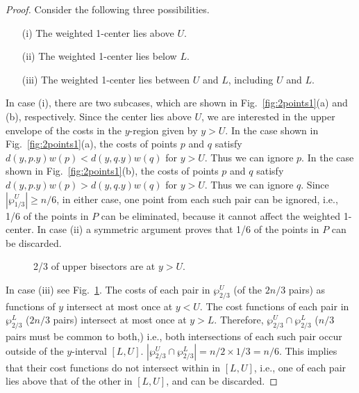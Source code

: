 \documentclass[preprint,10pt]{elsarticle}
\begin{document}
\begin{proof}
Consider the following three possibilities.
\begin{enumerate}
\item[(i)]
The weighted 1-center lies above $U$.
\item[(ii)]
The weighted 1-center lies below $L$.
\item[(iii)]
The weighted 1-center lies between $U$ and $L$,
including $U$ and $L$.
\end{enumerate}

In case (i), there are two subcases,
which are shown in Fig.~\ref{fig:2points1}(a) and (b), respectively.
Since the center lies above $U$, 
we are interested in the upper envelope of the costs in the 
$y$-region given by $y > U$.
In the case shown in Fig.~\ref{fig:2points1}(a),
the costs of points $p$ and $q$ satisfy $d(y,p.y)w(p) <  d(y,q.y)w(q)$ for $y > U$.
Thus we can ignore $p$.
In the case shown in Fig.~\ref{fig:2points1}(b),
 the costs of points $p$ and $q$ satisfy
$d(y,p.y)w(p) >  d(y,q.y)w(q)$ for $y > U$.
Thus we can ignore $q$.
Since $|\wp^U_{1/3}|\geq n/6$,
in either case, one point from each such pair can be ignored,
i.e., 1/6 of the points in $P$ can be eliminated, because it cannot affect the weighted 1-center.
In case (ii) a symmetric argument proves that 1/6 of the points in $P$ can be discarded.

\begin{figure}[ht]
\centering
{}
\hspace{2mm}
\caption{2/3 of upper bisectors are at $y> U$.}
\label{fig:2points3}
\end{figure}

In case (iii) see Fig.~\ref{fig:2points3}.
The costs of each pair in $\wp^U_{2/3}$ (of the $2n/3$ pairs) as functions of $y$ intersect at most once at $y<U$.
The cost functions of each pair in $\wp^L_{2/3}$ ($2n/3$ pairs) intersect at most once at $y>L$.
Therefore, $\wp^U_{2/3}\cap \wp^L_{2/3}$  ($n/3$ pairs must be common to both,)
i.e., both intersections of each such pair occur outside of the $y$-interval $[L,U]$.
$|\wp^U_{2/3}\cap \wp^L_{2/3}| = n/2 \times 1/3 = n/6$.
This implies that their cost functions do not intersect within in $[L,U]$,
i.e., one of each pair lies above that of the other in $[L,U]$,
and can be discarded.
\end{proof}
\end{document}
